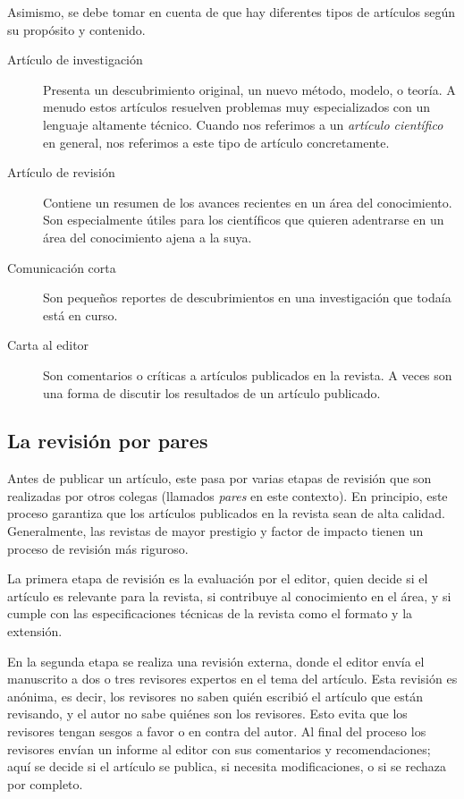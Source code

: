 Asimismo, se debe tomar en cuenta de que hay diferentes tipos de artículos según
su propósito y contenido.

\begin{description}
    \item[Artículo de investigación] Presenta un descubrimiento original, un
        nuevo método, modelo, o teoría.
        A menudo estos artículos resuelven problemas muy especializados con un
        lenguaje altamente técnico.
        Cuando nos referimos a un \emph{artículo científico} en general, nos
        referimos a este tipo de artículo concretamente.
    \item[Artículo de revisión] Contiene un resumen de los avances recientes en
        un área del conocimiento.
        Son especialmente útiles para los científicos que quieren adentrarse en
        un área del conocimiento ajena a la suya.
    \item[Comunicación corta] Son pequeños reportes de descubrimientos en una
        investigación que todaía está en curso.
    \item[Carta al editor] Son comentarios o críticas a artículos publicados en
        la revista.
        A veces son una forma de discutir los resultados de un artículo
        publicado.
\end{description}

\subsection*{La revisión por pares}
Antes de publicar un artículo, este pasa por varias etapas de revisión que son
realizadas por otros colegas (llamados \emph{pares} en este contexto).
En principio, este proceso garantiza que los artículos publicados en la
revista sean de alta calidad.
Generalmente, las revistas de mayor prestigio y factor de impacto tienen un
proceso de revisión más riguroso.

La primera etapa de revisión es la evaluación por el editor, quien decide si el
artículo es relevante para la revista, si contribuye al conocimiento en el área,
y si cumple con las especificaciones técnicas de la revista como el formato y
la extensión.

En la segunda etapa se realiza una revisión externa, donde el editor envía el
manuscrito a dos o tres revisores expertos en el tema del artículo.
Esta revisión es anónima, es decir, los revisores no saben quién escribió el
artículo que están revisando, y el autor no sabe quiénes son los revisores.
Esto evita que los revisores tengan sesgos a favor o en contra del autor.
Al final del proceso los revisores envían un informe al editor con sus
comentarios y recomendaciones; aquí se decide si el artículo se publica, si
necesita modificaciones, o si se rechaza por completo.

